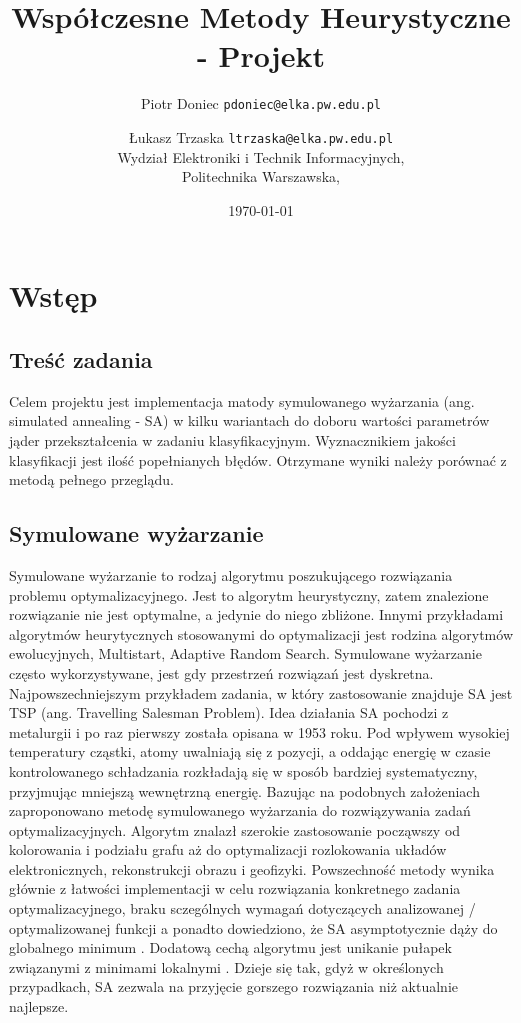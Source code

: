 \documentclass{article}
\begin{document}
\title{Współczesne Metody Heurystyczne - Projekt}
\author{
    Piotr Doniec \texttt{pdoniec@elka.pw.edu.pl}
    \and
    Łukasz Trzaska \texttt{ltrzaska@elka.pw.edu.pl}\\
    Wydział Elektroniki i Technik Informacyjnych,\\
    Politechnika Warszawska,\\
}

\date{\today}
\maketitle

\section{Wstęp}
\subsection{Treść zadania}
Celem projektu jest implementacja matody symulowanego wyżarzania (ang. simulated annealing - SA) w kilku wariantach do doboru wartości parametrów jąder przekształcenia w zadaniu klasyfikacyjnym. Wyznacznikiem jakości klasyfikacji jest ilość popełnianych błędów. Otrzymane wyniki należy porównać z metodą pełnego przeglądu.

\subsection{Symulowane wyżarzanie}
Symulowane wyżarzanie to rodzaj algorytmu poszukującego rozwiązania problemu optymalizacyjnego. Jest to algorytm heurystyczny, zatem znalezione rozwiązanie nie jest optymalne, a jedynie do niego zbliżone. Innymi przykładami algorytmów heurytycznych stosowanymi do optymalizacji jest rodzina algorytmów ewolucyjnych, Multistart, Adaptive Random Search.\linebreak
Symulowane wyżarzanie często wykorzystywane, jest gdy przestrzeń rozwiązań jest dyskretna. Najpowszechniejszym przykładem zadania, w który zastosowanie znajduje SA jest TSP (ang. Travelling Salesman Problem). Idea działania SA pochodzi z metalurgii i po raz pierwszy została opisana w 1953 roku. Pod wpływem wysokiej temperatury cząstki, atomy uwalniają się z pozycji, a oddając energię w czasie kontrolowanego schładzania rozkładają się w sposób bardziej systematyczny, przyjmując mniejszą wewnętrzną energię. Bazując na podobnych założeniach zaproponowano metodę symulowanego wyżarzania do rozwiązywania zadań optymalizacyjnych. \linebreak Algorytm znalazł szerokie zastosowanie począwszy od kolorowania i podziału grafu aż do optymalizacji rozlokowania układów elektronicznych, rekonstrukcji obrazu i geofizyki. Powszechność metody wynika głównie z łatwości implementacji w celu rozwiązania konkretnego zadania optymalizacyjnego, braku sczególnych wymagań dotyczących analizowanej / optymalizowanej funkcji a ponadto dowiedziono, że SA asymptotycznie dąży do globalnego minimum \cite{varts00}. Dodatową cechą algorytmu jest unikanie pułapek związanymi z minimami lokalnymi . Dzieje się tak, gdyż w określonych przypadkach, SA zezwala na przyjęcie gorszego rozwiązania niż aktualnie najlepsze.
\end{document}
